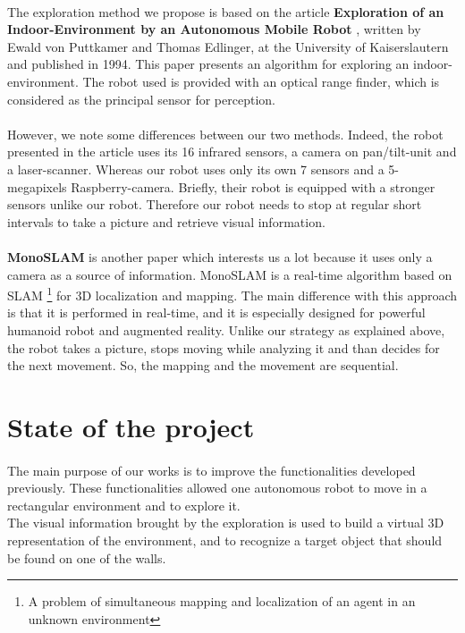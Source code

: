 \documentclass[12pt]{report}
\begin{document}
\paragraph {}
The exploration method we propose is based on the article \textbf {Exploration of an Indoor-Environment by an Autonomous Mobile Robot} \cite{edlinger_exploration_1994}, written by Ewald von Puttkamer and Thomas Edlinger, at the University of Kaiserslautern and published in 1994. This paper presents an algorithm for exploring an indoor-environment. The robot used is provided with an optical range finder, which is considered as the principal sensor for perception. 

\paragraph {}
However, we note some differences between our two methods. Indeed, the robot presented in the article uses its 16 infrared sensors, a camera on pan/tilt-unit and a laser-scanner. Whereas our robot uses only its own 7 sensors and a  5-megapixels Raspberry-camera. Briefly, their robot is equipped with a stronger sensors unlike our robot. Therefore our robot needs to stop at regular short intervals to take a picture and retrieve visual information. 

\paragraph {}
\textbf{MonoSLAM} \cite{davison_monoslam:_2007} is another paper which interests us a lot because it uses only a camera as a source of information. MonoSLAM is a real-time algorithm based on SLAM \footnote{A problem of simultaneous mapping and localization of an agent in an unknown environment} for 3D localization and mapping. The main difference with this approach is that it is performed in real-time, and it is especially designed for powerful humanoid robot and augmented reality. Unlike our strategy as explained above, the robot takes a picture, stops moving while analyzing it and than decides for the next movement. So, the mapping and the movement are sequential. 
\section{State of the project}
\paragraph {}
	The main purpose of our works is to improve the functionalities developed previously. These functionalities 
allowed one autonomous robot to move in a rectangular environment and to explore it.\\
	The visual information brought by the exploration is used to build a virtual 3D representation of 
the environment, and to recognize a target object that should be found on one of the walls. 
\end{document}

